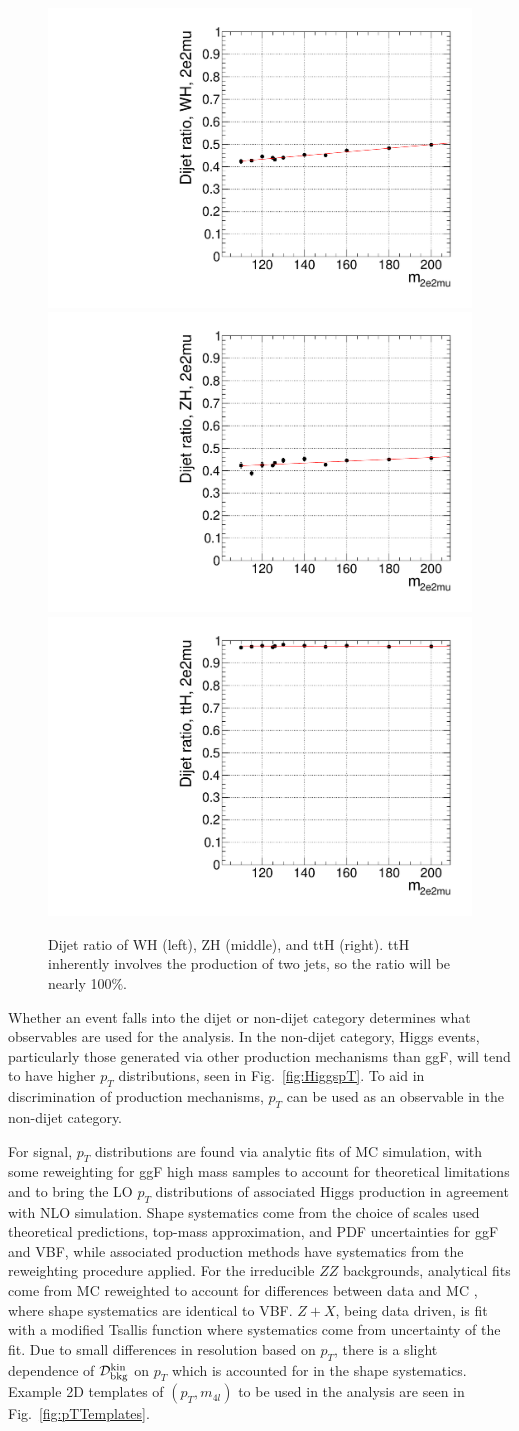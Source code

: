 \begin{figure}[htbp]
\begin{center}
\includegraphics[width=.3\linewidth]{HiggsDiscovery/figures/eff_WH_2e2mu_ratio.pdf}
\includegraphics[width=.3\linewidth]{HiggsDiscovery/figures/eff_ZH_2e2mu_ratio.pdf}
\includegraphics[width=.3\linewidth]{HiggsDiscovery/figures/eff_ttH_2e2mu_ratio.pdf}
\caption[Dijet Ratio of Associated Production as Function of $m_H$]{Dijet ratio of WH (left), ZH (middle), and ttH (right). ttH inherently involves the production of two jets, so the ratio will be nearly 100\%.}
\label{fig:DijetRatioAss}
\end{center}
\end{figure}

Whether an event falls into the dijet or non-dijet category determines what observables are used for the analysis. In the non-dijet category, Higgs events, particularly those generated via other production mechanisms than ggF, will tend to have higher $p_T$ distributions, seen in Fig.~\ref{fig:HiggspT}. To aid in discrimination of production mechanisms, $p_T$ can be used as an observable in the non-dijet category.

For signal, $p_T$ distributions are found via analytic fits of MC simulation, with some reweighting for ggF high mass samples to account for theoretical limitations and to bring the LO $p_T$ distributions of associated Higgs production in agreement with NLO simulation. Shape systematics come from the choice of scales used theoretical predictions, top-mass approximation, and PDF uncertainties for ggF and VBF, while associated production methods have systematics from the reweighting procedure applied. For the irreducible $ZZ$ backgrounds, analytical fits come from MC reweighted to account for differences between data and MC \cite{}, where shape systematics are identical to VBF. $Z+X$, being data driven, is fit with a modified Tsallis function \cite{} where systematics come from uncertainty of the fit. Due to small differences in resolution based on $p_T$, there is a slight dependence of $\mathcal{D}_{\rm{bkg}}^{\rm{kin}}$ on $p_T$ which is accounted for in the shape systematics. Example 2D templates of $(p_T,m_{4l})$ to be used in the analysis are seen in Fig.~\ref{fig:pTTemplates}.


